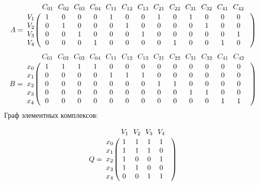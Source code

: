 \documentclass{article}
\begin{document}
\begin{figure}[h]
\end{figure}
$$
 A =
\bordermatrix{ & C_{01} \!&\! C_{02} \!&\! C_{03} \!&\! C_{04} \!&\! C_{11} \!&\! C_{12} \!&\! C_{13} \!&\! C_{21} \!&\! C_{22} \!&\! C_{31} \!&\! C_{32} \!&\! C_{41} \!&\! C_{42} \!&\! \cr 
V_{1} \!&\! 1 \!&\! 0 \!&\! 0 \!&\! 0 \!&\! 1 \!&\! 0 \!&\! 0 \!&\! 1 \!&\! 0 \!&\! 1 \!&\! 0 \!&\! 0 \!&\! 0 \!&\! \cr
V_{2} \!&\! 0 \!&\! 1 \!&\! 0 \!&\! 0 \!&\! 0 \!&\! 1 \!&\! 0 \!&\! 0 \!&\! 0 \!&\! 0 \!&\! 1 \!&\! 0 \!&\! 0 \!&\! \cr
V_{3} \!&\! 0 \!&\! 0 \!&\! 1 \!&\! 0 \!&\! 0 \!&\! 0 \!&\! 1 \!&\! 0 \!&\! 0 \!&\! 0 \!&\! 0 \!&\! 0 \!&\! 1 \!&\! \cr
V_{4} \!&\! 0 \!&\! 0 \!&\! 0 \!&\! 1 \!&\! 0 \!&\! 0 \!&\! 0 \!&\! 0 \!&\! 1 \!&\! 0 \!&\! 0 \!&\! 1 \!&\! 0 \!&\! \cr
}$$
$$
B =
\bordermatrix{ & C_{01} \!&\! C_{02} \!&\! C_{03} \!&\! C_{04} \!&\! C_{11} \!&\! C_{12} \!&\! C_{13} \!&\! C_{21} \!&\! C_{22} \!&\! C_{31} \!&\! C_{32} \!&\! C_{41} \!&\! C_{42} \!&\! \cr 
x_{0} \!&\! 1 \!&\! 1 \!&\! 1 \!&\! 1 \!&\! 0 \!&\! 0 \!&\! 0 \!&\! 0 \!&\! 0 \!&\! 0 \!&\! 0 \!&\! 0 \!&\! 0 \!&\! \cr
x_{1} \!&\! 0 \!&\! 0 \!&\! 0 \!&\! 0 \!&\! 1 \!&\! 1 \!&\! 1 \!&\! 0 \!&\! 0 \!&\! 0 \!&\! 0 \!&\! 0 \!&\! 0 \!&\! \cr
x_{2} \!&\! 0 \!&\! 0 \!&\! 0 \!&\! 0 \!&\! 0 \!&\! 0 \!&\! 0 \!&\! 1 \!&\! 1 \!&\! 0 \!&\! 0 \!&\! 0 \!&\! 0 \!&\! \cr
x_{3} \!&\! 0 \!&\! 0 \!&\! 0 \!&\! 0 \!&\! 0 \!&\! 0 \!&\! 0 \!&\! 0 \!&\! 0 \!&\! 1 \!&\! 1 \!&\! 0 \!&\! 0 \!&\! \cr
x_{4} \!&\! 0 \!&\! 0 \!&\! 0 \!&\! 0 \!&\! 0 \!&\! 0 \!&\! 0 \!&\! 0 \!&\! 0 \!&\! 0 \!&\! 0 \!&\! 1 \!&\! 1 \!&\! \cr
}$$
Граф элементных комплексов:
\begin{figure}[h]
\end{figure}
$$
Q =
\bordermatrix{ & V_{1} \!&\! V_{2} \!&\! V_{3} \!&\! V_{4} \!&\! \cr 
x_{0} \!&\! 1 \!&\! 1 \!&\! 1 \!&\! 1 \!&\! \cr
x_{1} \!&\! 1 \!&\! 1 \!&\! 1 \!&\! 0 \!&\! \cr
x_{2} \!&\! 1 \!&\! 0 \!&\! 0 \!&\! 1 \!&\! \cr
x_{3} \!&\! 1 \!&\! 1 \!&\! 0 \!&\! 0 \!&\! \cr
x_{4} \!&\! 0 \!&\! 0 \!&\! 1 \!&\! 1 \!&\! \cr
}$$
\end{document}

